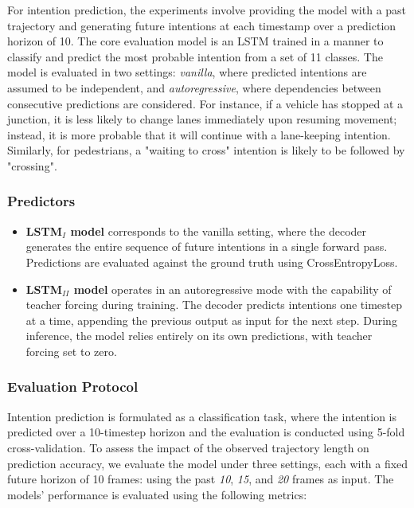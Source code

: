 For intention prediction, the experiments involve providing the model with a past trajectory and generating future intentions at each timestamp over a prediction horizon of 10. The core evaluation model is an LSTM trained in a manner to classify and predict the most probable intention from a set of 11 classes. The model is evaluated in two settings: \textit{vanilla}, where predicted intentions are assumed to be independent, and \textit{autoregressive}, where dependencies between consecutive predictions are considered. For instance, if a vehicle has stopped at a junction, it is less likely to change lanes immediately upon resuming movement; instead, it is more probable that it will continue with a lane-keeping intention. Similarly, for pedestrians, a "waiting to cross" intention is likely to be followed by "crossing".

\subsubsection{Predictors}
\begin{itemize}
    \item \textbf{LSTM$_{I}$ model} corresponds to the vanilla setting, where the decoder generates the entire sequence of future intentions in a single forward pass. Predictions are evaluated against the ground truth using CrossEntropyLoss.
    \item \textbf{LSTM$_{II}$ model} operates in an autoregressive mode with the capability of teacher forcing during training. The decoder predicts intentions one timestep at a time, appending the previous output as input for the next step. During inference, the model relies entirely on its own predictions, with teacher forcing set to zero.
\end{itemize}

\subsubsection{Evaluation Protocol}
Intention prediction is formulated as a classification task, where the intention is predicted over a 10-timestep horizon and the evaluation is conducted using 5-fold cross-validation. To assess the impact of the observed trajectory length on prediction accuracy, we evaluate the model under three settings, each with a fixed future horizon of 10 frames: using the past \textit{10}, \textit{15}, and \textit{20} frames as input. The models' performance is evaluated using the following metrics:

